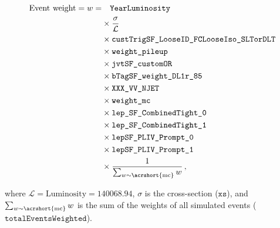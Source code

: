 \begin{align}
    \text{Event weight} = w =
     & \quad \texttt{YearLuminosity}                                       \nonumber \\
     & \times \frac{\sigma}{\mathcal{L}}                                   \nonumber \\
     & \times \texttt{custTrigSF\_LooseID\_FCLooseIso\_SLTorDLT}           \nonumber \\
     & \times \texttt{weight\_pileup}                                      \nonumber \\
     & \times \texttt{jvtSF\_customOR}                                     \nonumber \\
     & \times \texttt{bTagSF\_weight\_DL1r\_85}                            \nonumber \\
     & \times \texttt{XXX\_VV\_NJET}                                       \nonumber \\
     & \times \texttt{weight\_mc}                                          \nonumber \\
     & \times \texttt{lep\_SF\_CombinedTight\_0}                           \nonumber \\
     & \times \texttt{lep\_SF\_CombinedTight\_1}                           \nonumber \\
     & \times \texttt{lepSF\_PLIV\_Prompt\_0}                              \nonumber \\
     & \times \texttt{lepSF\_PLIV\_Prompt\_1}                              \nonumber \\
     & \times \frac{1}{\sum_{w \sim \text{\acrshort{mc}}} w}\,,
\end{align}

where $\mathcal{L} = \text{Luminosity} = 140068.94$, $\sigma$ is the cross-section ($\texttt{xs}$), and $\sum_{w \sim
        \text{\acrshort{mc}}} w$ is the sum of the weights of all simulated events ($\texttt{totalEventsWeighted}$).





